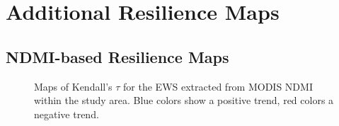 \section{Additional Resilience Maps}
\subsection{NDMI-based Resilience Maps}
\begin{figure}[htpb]
	\caption{Maps of Kendall's $ \tau $ for the EWS extracted from MODIS NDMI within the study area. Blue colors show a positive trend, red colors a negative trend.}\label{res:ndmiacf1}
\end{figure}	
